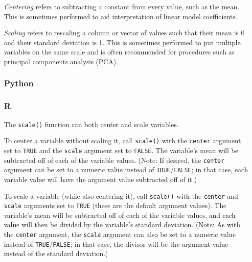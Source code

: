 \documentclass[
]{book}
\newenvironment{Shaded}{\begin{snugshade}}{\end{snugshade}}
\newcommand{\AttributeTok}[1]{\textcolor[rgb]{0.77,0.63,0.00}{#1}}
\newcommand{\DecValTok}[1]{\textcolor[rgb]{0.00,0.00,0.81}{#1}}
\newcommand{\FloatTok}[1]{\textcolor[rgb]{0.00,0.00,0.81}{#1}}
\newcommand{\FunctionTok}[1]{\textcolor[rgb]{0.00,0.00,0.00}{#1}}
\newcommand{\NormalTok}[1]{#1}
\newcommand{\OtherTok}[1]{\textcolor[rgb]{0.56,0.35,0.01}{#1}}
\newcommand{\SpecialCharTok}[1]{\textcolor[rgb]{0.00,0.00,0.00}{#1}}
\begin{document}
\emph{Centering} refers to subtracting a constant from every value, such as the mean. This is sometimes performed to aid interpretation of linear model coefficients.

\emph{Scaling} refers to rescaling a column or vector of values such that their mean is 0 and their standard deviation is 1. This is sometimes performed to put multiple variables on the same scale and is often recommended for procedures such as principal components analysis (PCA).

\hypertarget{python-37}{%
\subsubsection*{Python}\label{python-37}}

\hypertarget{r-37}{%
\subsubsection*{R}\label{r-37}}

The \texttt{scale()} function can both center and scale variables.

To center a variable without scaling it, call \texttt{scale()} with the \texttt{center} argument set to \texttt{TRUE} and the \texttt{scale} argument set to \texttt{FALSE}. The variable's mean will be subtracted off of each of the variable values. (Note: If desired, the \texttt{center} argument can be set to a numeric value instead of \texttt{TRUE}/\texttt{FALSE}; in that case, each variable value will have the argument value subtracted off of it.)

\begin{Shaded}
\end{Shaded}

To scale a variable (while also centering it), call \texttt{scale()} with the \texttt{center} and \texttt{scale} arguments set to \texttt{TRUE} (these are the default argument values). The variable's mean will be subtracted off of each of the variable values, and each value will then be divided by the variable's standard deviation. (Note: As with the \texttt{center} argument, the \texttt{scale} argument can also be set to a numeric value instead of \texttt{TRUE}/\texttt{FALSE}; in that case, the divisor will be the argument value instead of the standard deviation.)
\end{document}
